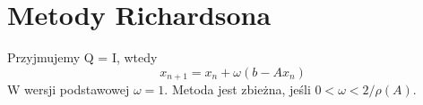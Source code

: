 \section{Metody Richardsona}
Przyjmujemy Q = I, wtedy
\[
    x_{n+1} = x_n + \omega(b - Ax_n)
\]
W wersji podstawowej \( \omega = 1 \). Metoda jest zbieżna, jeśli \( 0 < \omega < 2 / \rho(A) \).
